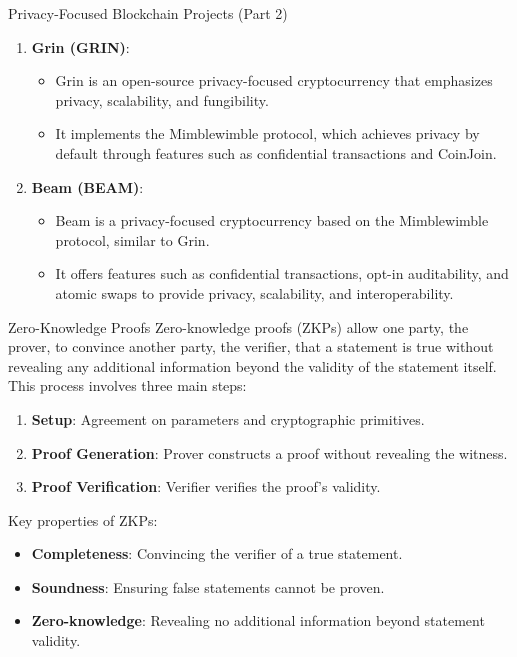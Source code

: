 \begin{withoutheadline}
\begin{frame}{Privacy-Focused Blockchain Projects (Part 2)}
\begin{enumerate}
        \item \textbf{Grin (GRIN)}:
            \begin{itemize}
                \item Grin is an open-source privacy-focused cryptocurrency that emphasizes privacy, scalability, and fungibility.
                \item It implements the Mimblewimble protocol, which achieves privacy by default through features such as confidential transactions and CoinJoin.
            \end{itemize}
        
        \item \textbf{Beam (BEAM)}:
            \begin{itemize}
                \item Beam is a privacy-focused cryptocurrency based on the Mimblewimble protocol, similar to Grin.
                \item It offers features such as confidential transactions, opt-in auditability, and atomic swaps to provide privacy, scalability, and interoperability.
            \end{itemize}
    \end{enumerate}
\end{frame}

\begin{frame}{Zero-Knowledge Proofs}
    Zero-knowledge proofs (ZKPs) allow one party, the prover, to convince another party, the verifier, that a statement is true without revealing any additional information beyond the validity of the statement itself. This process involves three main steps:
    
    \begin{enumerate}
        \item \textbf{Setup}: Agreement on parameters and cryptographic primitives.
        \item \textbf{Proof Generation}: Prover constructs a proof without revealing the witness.
        \item \textbf{Proof Verification}: Verifier verifies the proof's validity.
    \end{enumerate}
    
    Key properties of ZKPs:
    
    \begin{itemize}
        \item \textbf{Completeness}: Convincing the verifier of a true statement.
        \item \textbf{Soundness}: Ensuring false statements cannot be proven.
        \item \textbf{Zero-knowledge}: Revealing no additional information beyond statement validity.
    \end{itemize}
    

\end{frame}
\end{withoutheadline}

